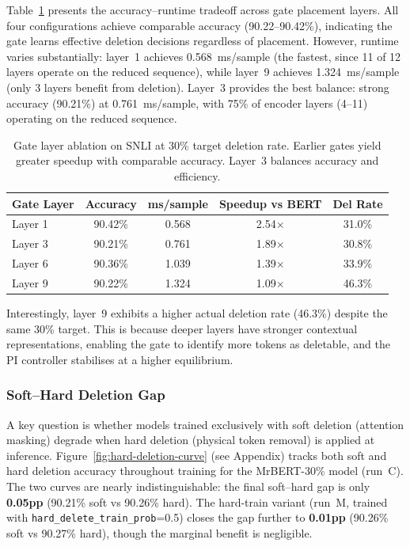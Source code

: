 Table~\ref{tab:gate-layer} presents the accuracy--runtime tradeoff across gate placement layers.
All four configurations achieve comparable accuracy (90.22--90.42\%), indicating the gate learns effective deletion decisions regardless of placement.
However, runtime varies substantially: layer~1 achieves 0.568~ms/sample (the fastest, since 11 of 12 layers operate on the reduced sequence), while layer~9 achieves 1.324~ms/sample (only 3 layers benefit from deletion).
Layer~3 provides the best balance: strong accuracy (90.21\%) at 0.761~ms/sample, with 75\% of encoder layers (4--11) operating on the reduced sequence.

\begin{table}[h]
\centering
\begin{tabular}{@{}lcccc@{}}
\toprule
\textbf{Gate Layer} & \textbf{Accuracy} & \textbf{ms/sample} & \textbf{Speedup vs BERT} & \textbf{Del Rate} \\
\midrule
Layer 1  & 90.42\% & 0.568 & 2.54$\times$ & 31.0\% \\
Layer 3  & 90.21\% & 0.761 & 1.89$\times$ & 30.8\% \\
Layer 6  & 90.36\% & 1.039 & 1.39$\times$ & 33.9\% \\
Layer 9  & 90.22\% & 1.324 & 1.09$\times$ & 46.3\% \\
\bottomrule
\end{tabular}
\caption{Gate layer ablation on SNLI at 30\% target deletion rate. Earlier gates yield greater speedup with comparable accuracy. Layer~3 balances accuracy and efficiency.}
\label{tab:gate-layer}
\end{table}

Interestingly, layer~9 exhibits a higher actual deletion rate (46.3\%) despite the same 30\% target.
This is because deeper layers have stronger contextual representations, enabling the gate to identify more tokens as deletable, and the PI controller stabilises at a higher equilibrium.


\subsubsection{Soft--Hard Deletion Gap}

A key question is whether models trained exclusively with soft deletion (attention masking) degrade when hard deletion (physical token removal) is applied at inference.
Figure~\ref{fig:hard-deletion-curve} (see Appendix) tracks both soft and hard deletion accuracy throughout training for the MrBERT-30\% model (run~C).
The two curves are nearly indistinguishable: the final soft--hard gap is only \textbf{0.05pp} (90.21\% soft vs 90.26\% hard).
The hard-train variant (run~M, trained with \texttt{hard\_delete\_train\_prob}=0.5) closes the gap further to \textbf{0.01pp} (90.26\% soft vs 90.27\% hard), though the marginal benefit is negligible.

